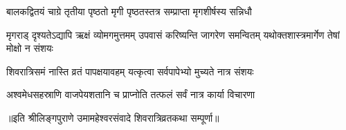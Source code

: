 \twolineshloka
{बालकद्वितयं चाग्रे तृतीया पृष्ठतो मृगी}
{पृष्ठतस्तत्र सम्प्राप्ता मृगशीर्षस्य सन्निधौ}%

\threelineshloka
{मृगराड् दृश्यतेऽद्यापि ऋक्षं व्योमगमुत्तमम्}
{उपवासं करिष्यन्ति जागरेण समन्वितम्}%
{यथोक्तशास्त्रमार्गेण तेषां मोक्षो न संशयः}

\twolineshloka
{शिवरात्रिसमं नास्ति व्रतं पापक्षयावहम्}
{यत्कृत्वा सर्वपापेभ्यो मुच्यते नात्र संशयः}%

\twolineshloka
{अश्वमेधसहस्राणि वाजपेयशतानि च}
{प्राप्नोति तत्फलं सर्वं नात्र कार्या विचारणा}%

॥इति श्रीलिङ्गपुराणे उमामहेश्वरसंवादे शिवरात्रिव्रतकथा सम्पूर्णा॥

\genMangalaShloka